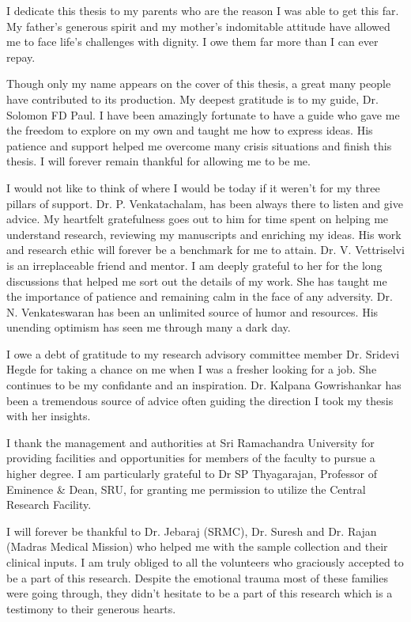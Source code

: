 
 

I dedicate this thesis to my parents who are the reason I was able to get this far. My father’s generous spirit and my mother’s indomitable attitude have allowed me to face life’s challenges with dignity. I owe them far more than I can ever repay.

Though only my name appears on the cover of this thesis, a great many people have contributed to its production. My deepest gratitude is to my guide, Dr. Solomon FD Paul. I have been amazingly fortunate to have a guide who gave me the freedom to explore on my own and taught me how to express ideas. His patience and support helped me overcome many crisis situations and finish this thesis. I will forever remain thankful for allowing me to be me.

I would not like to think of where I would be today if it weren’t for my three pillars of support. Dr. P. Venkatachalam, has been always there to listen and give advice. My heartfelt gratefulness goes out to him for time spent on helping me understand research, reviewing my manuscripts and enriching my ideas. His work and research ethic will forever be a benchmark for me to attain. Dr. V. Vettriselvi is an irreplaceable friend and mentor. I am deeply grateful to her for the long discussions that helped me sort out the details of my work. She has taught me the importance of patience and remaining calm in the face of any adversity. Dr. N. Venkateswaran has been an unlimited source of humor and resources. His unending optimism has seen me through many a dark day.

I owe a debt of gratitude to my research advisory committee member Dr. Sridevi Hegde for taking a chance on me when I was a fresher looking for a job. She continues to be my confidante and an inspiration. Dr. Kalpana Gowrishankar has been a tremendous source of advice often guiding the direction I took my thesis with her insights. 

I thank the management and authorities at Sri Ramachandra University for providing facilities and opportunities for members of the faculty to pursue a higher degree. I am particularly grateful to Dr SP Thyagarajan, Professor of Eminence \& Dean, SRU, for granting me permission to utilize the Central Research Facility. 

I will forever be thankful to Dr. Jebaraj (SRMC), Dr. Suresh and Dr. Rajan (Madras Medical Mission) who helped me with the sample collection and their clinical inputs.  I am truly obliged to all the volunteers who graciously accepted to be a part of this research. Despite the emotional trauma most of these families were going through, they didn’t hesitate to be a part of this research which is a testimony to their generous hearts. 

